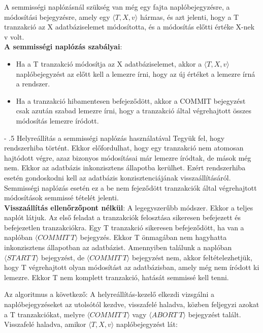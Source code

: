 \documentclass[margin=0px]{article}
\makeatletter
\renewcommand\paragraph{%
	\@startsection{paragraph}{4}{0mm}%
	{-\baselineskip}%
	{.5\baselineskip}%
	{\normalfont\normalsize\bfseries}}
\makeatother
\begin{document}
	A semmisségi naplózásnál szükség van még egy fajta naplóbejegyzésre, a módosítási bejegyzésre, amely egy $\langle T,X,v\rangle$
	hármas, és azt jelenti, hogy a T tranzakció az X adatbáziselemet módosította, és a módosítás előtti értéke X-nek v volt.\\
	
	\noindent \textbf{A semmisségi naplózás szabályai}:
	\begin{itemize}
		\item	Ha a T tranzakció módosítja az X adatbáziselemet, akkor a $\langle T,X,v\rangle$ naplóbejegyzést az előtt kell
		a lemezre írni, hogy az új értéket a lemezre írná a rendszer.
		
		\item	Ha a tranzakció hibamentesen befejeződött, akkor a COMMIT bejegyzést csak azután szabad lemezre írni, hogy
		a tranzakció által végrehajtott összes módosítás lemezre íródott.
	\end{itemize}
	
	\paragraph{Helyreállítás a semmisségi naplózás használatával}
	Tegyük fel, hogy rendszerhiba történt. Ekkor előfordulhat, hogy egy tranzakció nem atomosan hajtódott végre, azaz
	bizonyos módosításai már lemezre íródtak, de mások még nem. Ekkor az adatbázis inkonzisztens állapotba kerülhet.
	Ezért rendszerhiba esetén gondoskodni kell az adatbázis konzisztenciájának visszaállításáról. Semmisségi naplózás
	esetén ez a be nem fejeződött tranzakciók által végrehajtott módosítások semmissé tételét jelenti.\\
	
	\noindent \textbf{Visszaállítás ellenőrzőpont nélkül}: A legegyszerűbb módszer. Ekkor a teljes naplót látjuk. Az első feladat
	a tranzakciók felosztása sikeresen befejezett és befejezetlen tranzakciókra. Egy T tranzakció sikeresen befejeződött, ha
	van a naplóban $\langle COMMIT \ T \rangle$ bejegyzés. Ekkor T önmagában nem hagyhatta inkonzisztens állapotban az adatbázist.
	Amennyiben találunk a naplóban $\langle START \ T \rangle$ bejegyzést, de $\langle COMMIT \ T \rangle$ bejegyzést nem, akkor
	feltételezhetjük, hogy T végrehajtott olyan módosítást az adatbázisban, amely még nem íródott ki lemezre. Ekkor T nem komplett
	tranzakció, hatását semmissé kell tenni. 
	
	\noindent Az algoritmus a következő:
	A helyreállítás-kezelő elkezdi vizsgálni a naplóbejegyzéseket az utolsótól kezdve, visszafelé haladva, közben feljegyzi azokat a
	T tranzakciókat, melyre $\langle COMMIT \ T \rangle$ vagy $\langle ABORT \ T \rangle$ bejegyzést talált. Visszafelé
	haladva, amikor $\langle T,X,v\rangle$ naplóbejegyzést lát:
	
\end{document}

